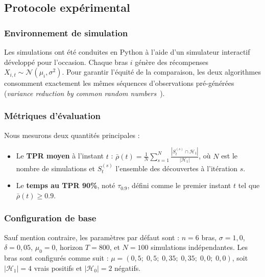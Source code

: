 \documentclass[11pt,a4paper]{article}
\begin{document}
\subsection{Protocole expérimental}

\subsubsection{Environnement de simulation}

Les simulations ont été conduites en Python à l'aide d'un simulateur
interactif développé pour l'occasion. Chaque bras $i$ génère des
récompenses $X_{i,t} \sim \mathcal{N}(\mu_i, \sigma^2)$. Pour garantir
l'équité de la comparaison, les deux algorithmes consomment exactement
les mêmes séquences d'observations pré-générées (\textit{variance
reduction by common random numbers}~\cite{johari2022}).

\subsubsection{Métriques d'évaluation}

Nous mesurons deux quantités principales :

\begin{itemize}
  \item Le \textbf{TPR moyen} à l'instant $t$ :
  $\bar{\rho}(t) = \frac{1}{N}\sum_{s=1}^{N}
    \frac{|S_t^{(s)} \cap \mathcal{H}_1|}{|\mathcal{H}_1|}$,
  où $N$ est le nombre de simulations et $S_t^{(s)}$ l'ensemble des
  découvertes à l'itération $s$.
  \item Le \textbf{temps au TPR 90\%}, noté $\tau_{0.9}$, défini comme
  le premier instant $t$ tel que $\bar{\rho}(t) \geq 0.9$.
\end{itemize}

\subsubsection{Configuration de base}

Sauf mention contraire, les paramètres par défaut sont :
$n = 6$ bras, $\sigma = 1{,}0$, $\delta = 0{,}05$, $\mu_0 = 0$,
horizon $T = 800$, et $N = 100$ simulations indépendantes.
Les bras sont configurés comme suit :
$\mu = (0{,}5;\; 0{,}5;\; 0{,}35;\; 0{,}35;\; 0{,}0;\; 0{,}0)$,
soit $|\mathcal{H}_1| = 4$ vrais positifs et
$|\mathcal{H}_0| = 2$ négatifs.
\end{document}
